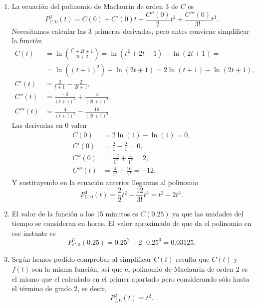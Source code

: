 {\begin{enumerate}
\item La ecuación del polinomio de Maclaurin de orden 3 de $C$ es
\begin{equation}
P_{C,0}^3(t) = C(0)+ C'(0)t + \frac{C''(0)}{2}t^2 + \frac{C'''(0)}{3!}t^3.
\end{equation}
Necesitamos calcular las 3 primeras derivadas, pero antes conviene simplificar la función
\begin{align*}
C(t)&= \ln\left(\frac{t^2+2t+1}{2t+2}\right)= \ln(t^2+2t+1)-\ln(2t+1) =\\
&= \ln((t+1)^2) -\ln(2t+1) = 2\ln(t+1)-\ln(2t+1),\\
C'(t)&= \frac{2}{t+1}-\frac{2}{2t+1},\\
C''(t)&= \frac{-2}{(t+1)^2}+\frac{4}{(2t+1)^2},\\
C'''(t)&= \frac{4}{(t+1)^3}-\frac{16}{(2t+1)^3}
\end{align*}
Las derivadas en 0 valen
\begin{align*}
C(0)&=  2\ln(1)-\ln(1) = 0,\\
C'(0)&= \frac{2}{1}-\frac{2}{1}= 0,\\
C''(0)&= \frac{-2}{1^2}+\frac{4}{1^2} = 2,\\
C'''(t)&= \frac{4}{1^3}-\frac{16}{1^3} = -12.
\end{align*}
Y sustituyendo en la ecuación anterior llegamos al polinomio
\[
P_{C,0}^3(t) = \frac{2}{2}t^2 - \frac{12}{3!}t^3 = t^2-2t^3.
\]

\item El valor de la función a los 15 minutos es $C(0.25)$ ya que las unidades del tiempo se consideran en horas. El valor aproximado de que da el polinomio en ese instante es
\[
P_{C,0}^3(0.25) = 0.25^2-2\cdot 0.25^3 = 0.03125.
\]

\item Según hemos podido comprobar al simplificar $C(t)$ resulta que $C(t)$ y $f(t)$ son la misma función, así que el polinomio de Maclaurin de orden 2 es el mismo que el calculado en el primer apartado pero considerando sólo hasta el término de grado 2, es decir,
\[
P_{f,0}^2(t) = t^2.
\]
\end{enumerate}
}


